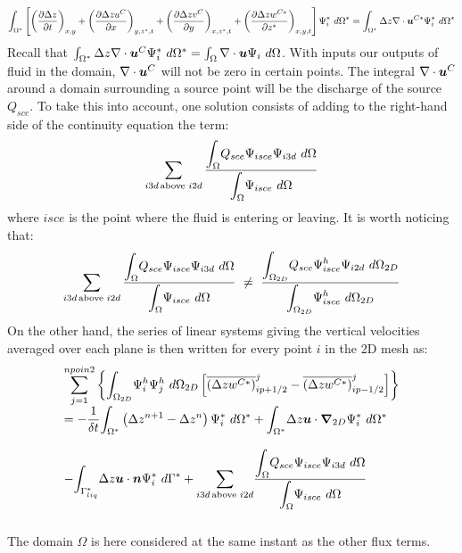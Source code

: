 \begin{equation}
\int_{\Omega^{\ast}}\left[\left(\dfrac{\partial\Delta z}{\partial t}\right)_{x,y}
+\left(\dfrac{\partial\Delta zu^C}{\partial x}\right)_{y,z^{\ast},t}
+\left(\dfrac{\partial\Delta zv^C}{\partial y}\right)_{x,z^{\ast},t}
+\left(\dfrac{\partial\Delta zw^{C\ast}}{\partial z^{\ast}}\right)_{x,y,t}\right]
\Psi_{i}^{\ast}~d\Omega^{\ast}
=\int_{\Omega^{\ast}}\Delta z\nabla \cdot\bm{u}^{C\ast}\Psi_{i}^{\ast}~d\Omega^{\ast}
\end{equation}
Recall that \mbox{$\int_{\Omega^{\ast}}\Delta z\nabla \cdot\bm{u}^C\Psi_{i}^{\ast}~d\Omega^{\ast}=\int_{\Omega}\nabla \cdot\bm{u}\Psi_{i}~d\Omega$}. With inputs our
outputs of fluid in the domain, $\nabla \cdot\bm{u}^C$ will not be
zero in certain points. The integral $\nabla \cdot\bm{u}^C$ around a domain
surrounding a source point will be the discharge
of the source $Q_{sce}$.
To take this into account, one solution consists of
adding to the right-hand side of the continuity equation the term:%
\begin{equation}
\sum_{i3d\text{\thinspace above\thinspace\thinspace}i2d}\dfrac{
\displaystyle{\int_{\Omega}}
Q_{sce}\Psi_{isce}\Psi_{i3d}~d\Omega}{\displaystyle{\int_{\Omega}}
\Psi_{isce}~d\Omega}
\end{equation}
where $isce$ is the point where the fluid is entering or leaving.
It is worth noticing that:
\begin{equation}
\sum_{i3d\text{\thinspace above\thinspace\thinspace}i2d}
\dfrac{\displaystyle{\int_{\Omega}}
Q_{sce}\Psi_{isce}\Psi_{i3d}~d\Omega}{\displaystyle{\int_{\Omega}}
\Psi_{isce}~d\Omega}\text{ }\neq\text{ }\dfrac{
\displaystyle{\int_{\Omega_{2D}}}
Q_{sce}\Psi_{isce}^{h}\Psi_{i2d}~d\Omega_{2D}}{\displaystyle{\int_{\Omega_{2D}}}
\Psi_{isce}^{h}~d\Omega_{2D}}%
\end{equation}
On the other hand, the series of linear systems giving
the vertical velocities averaged over each plane is then
written for every point $i$ in the 2D mesh as:%
\begin{equation}
\begin{array}{l}
\displaystyle{\sum_{j=1}^{npoin2}}\left\{
\displaystyle{\int_{\Omega_{2D}}}\Psi_{i}^{h}\Psi_{j}^{h}~d\Omega_{2D}
\left[\overline{\left(\Delta zw^{C\ast}\right)}_{ip+1/2}^{j}
-\overline{\left(\Delta zw^{C\ast}\right)}_{ip-1/2}^{j}\right]
\right\}\\\bigskip
=-\dfrac{1}{\delta t}\displaystyle{\int_{\Omega^{\ast}}}
\left(\Delta z^{n+1}-\Delta z^{n}\right)
\Psi_{i}^{\ast}~d\Omega^{\ast}+\displaystyle{\int_{\Omega^{\ast}}}
\Delta z\vec{u}\cdot\Grad_{2D}\Psi_{i}^{\ast}~d\Omega^{\ast}\\\bigskip
-\displaystyle{\int_{\Gamma_{liq}^{\ast}}}
\Delta z\vec{u}\cdot\vec{n}\Psi_{i}^{\ast}~d\Gamma^{\ast}
+\displaystyle{\sum_{i3d\text{\thinspace above\thinspace\thinspace}i2d}}
\dfrac{\displaystyle{\int_{\Omega}}Q_{sce}\Psi_{isce}
\Psi_{i3d}~d\Omega}{\displaystyle{\int_{\Omega}}\Psi_{isce}~d\Omega}
\end{array}
\end{equation}
The domain $\Omega$ is here considered at the same instant as
the other flux terms.

